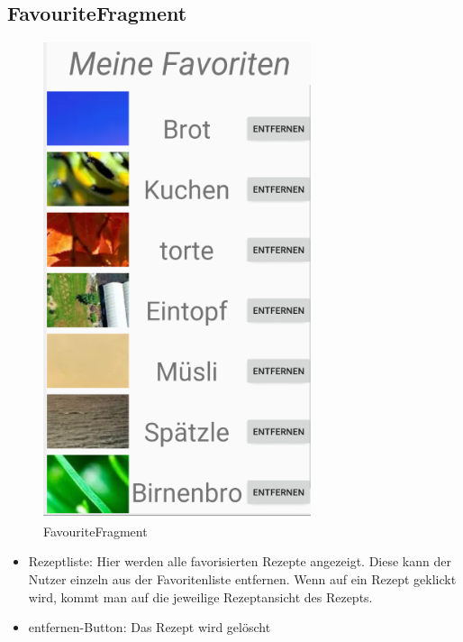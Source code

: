 \subsection{FavouriteFragment}
\begin{figure}[H]
	\centering
	\includegraphics[width=0.7\textwidth]{pics/favouriteFragment.png}%
	\caption{FavouriteFragment}%
	\label{view}%
\end{figure}


\begin{itemize}[nosep]
	\item Rezeptliste: Hier werden alle favorisierten Rezepte angezeigt. Diese kann der Nutzer einzeln aus der Favoritenliste entfernen. Wenn auf ein Rezept geklickt wird, kommt man auf die jeweilige Rezeptansicht des Rezepts.
	\item entfernen-Button: Das Rezept wird gelöscht
\end{itemize}

\newpage
